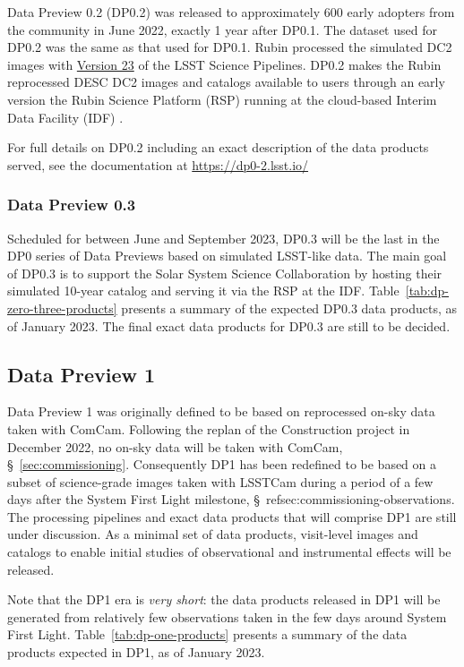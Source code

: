 Data Preview 0.2 (DP0.2) was released to approximately 600 early adopters from the community in June 2022, exactly 1 year after DP0.1. 
The dataset used for DP0.2 was the same as that used for DP0.1.
Rubin processed the simulated DC2 images with \href{https://pipelines.lsst.io/v/v23_0_0/index.html}{Version 23} of the LSST Science Pipelines. 
DP0.2 makes the Rubin reprocessed DESC DC2 images and catalogs available to users through an early version the Rubin Science Platform (RSP) running at the cloud-based Interim Data Facility (IDF) . 

For full details on DP0.2 including an exact description of the data products served, see the documentation at \url{https://dp0-2.lsst.io/}

\subsubsection{Data Preview 0.3}

Scheduled for between June and September 2023, DP0.3 will be the last in the DP0 series of Data Previews based on simulated LSST-like data. 
The main goal of DP0.3 is to support the Solar System Science Collaboration by hosting their simulated 10-year catalog and serving it via the RSP at the IDF. 
Table~\ref{tab:dp-zero-three-products} presents a summary of the expected DP0.3 data products, as of January 2023.
The final exact data products for DP0.3 are still to be decided. 

\subsection{Data Preview 1}

Data Preview 1 was originally defined to be based on reprocessed on-sky data taken with ComCam.
Following the replan of the Construction project in December 2022, no on-sky data will be taken with ComCam, \S~\ref{sec:commissioning}.
Consequently DP1 has been redefined to be based on a subset of science-grade images taken with LSSTCam during a period of a few days after the System First Light milestone, \S~ref{sec:commissioning-observations}.
The processing pipelines and exact data products that will comprise DP1 are still under discussion. 
As a minimal set of data products, visit-level images and catalogs to enable initial studies of observational and instrumental effects will be released. 

Note that the DP1 era is \textit{very short}: the data products released in DP1 will be generated from relatively few observations taken in the few days around System First Light.
Table~\ref{tab:dp-one-products} presents a summary of the data products expected in DP1, as of January 2023.

